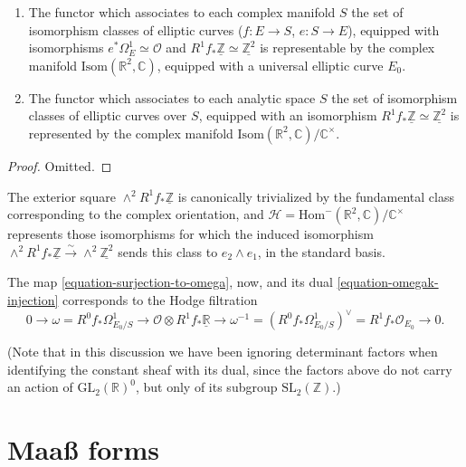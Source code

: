 \begin{proposition}
 \label{proposition-moduli}
\begin{enumerate}
 \item The functor which associates to each complex manifold $S$ the set of isomorphism classes of elliptic curves ($f:E\to S$, $e:S\to E$), 
 equipped with isomorphisms $e^*\Omega^1_E \simeq \mathcal O$ and
$R^1 f_* \underline{\mathbb Z} \simeq \underline{\mathbb Z^2}$ is representable by the complex manifold $\text{Isom}(\mathbb R^2 , \mathbb C)$,
equipped with a universal elliptic curve $E_0$.
 \item The functor which associates to each analytic space $S$ the set of isomorphism classes of
elliptic curves over $S$, equipped with an isomorphism $R^1 f_* \underline{\mathbb Z} \simeq \underline{\mathbb Z^2}$ is represented
by the complex manifold $\text{Isom}(\mathbb R^2, \mathbb C)/\mathbb C^\times$.
\end{enumerate}
\end{proposition}

\begin{proof}
 Omitted.
\end{proof}

The exterior square $\wedge^2 R^1 f_* \underline{\mathbb Z}$ is canonically trivialized by the fundamental class corresponding to the complex orientation, and $\mathcal H = \text{Hom}^-(\mathbb R^2, \mathbb C)/\mathbb C^\times$ represents those isomorphisms for which the induced isomorphism $\wedge^2 R^1 f_* \underline{\mathbb Z} \xrightarrow\sim \wedge^2 \underline{\mathbb Z^2}$ sends this class to $e_2\wedge e_1$, in the standard basis. 

The map \eqref{equation-surjection-to-omega}, now, and its dual \eqref{equation-omegak-injection} corresponds to the Hodge filtration
\begin{equation}
 \label{equation-Hodge-filtration}
0 \to \omega = R^0 f_*\Omega^1_{E_0/S}  \to \mathcal O \otimes R^1 f_* \underline{\mathbb R} \to \omega^{-1} = (R^0 f_* \Omega^1_{E_0/S})^\vee = R^1 f_* \mathcal O_{E_0} \to 0.
\end{equation}

(Note that in this discussion we have been ignoring determinant factors when identifying the constant sheaf with its dual, since the factors above do not carry an action of $\text{GL}_2(\mathbb R)^0$, but only of its subgroup $\text{SL}_2(\mathbb Z)$.)


\section{Maa{\ss} forms}
\label{section-Maass-forms}


